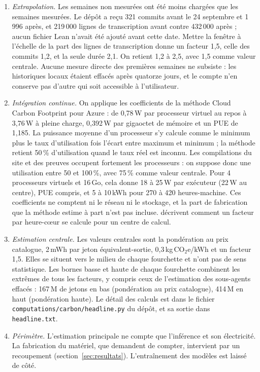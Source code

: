 \documentclass[11pt,a4paper]{article}
\newcommand{\COe}{\,kg\,CO$_2$e}
\begin{document}
\begin{enumerate}
\item \emph{Extrapolation.} Les semaines non mesurées ont été moins chargées que les semaines mesurées. Le dépôt a reçu 321 commits avant le 24 septembre et 1\,996 après, et 219\,000 lignes de transcription avant contre 432\,000 après ; aucun fichier Lean n'avait été ajouté avant cette date. Mettre la fenêtre à l'échelle de la part des lignes de transcription donne un facteur 1,5, celle des commits 1,2, et la seule durée 2,1. On retient 1,2 à 2,5, avec 1,5 comme valeur centrale. Aucune mesure directe des premières semaines ne subsiste : les historiques locaux étaient effacés après quatorze jours, et le compte n'en conserve pas d'autre qui soit accessible à l'utilisateur.
\item \emph{Intégration continue.} On applique les coefficients de la méthode Cloud Carbon Footprint pour Azure \citep{ccf} : de 0,78\,W par processeur virtuel au repos à 3,76\,W à pleine charge, 0,392\,W par gigaoctet de mémoire et un PUE de 1,185. La puissance moyenne d'un processeur s'y calcule comme le minimum plus le taux d'utilisation fois l'écart entre maximum et minimum ; la méthode retient 50\,\% d'utilisation quand le taux réel est inconnu. Les compilations du site et des preuves occupent fortement les processeurs : on suppose donc une utilisation entre 50 et 100\,\%, avec 75\,\% comme valeur centrale. Pour 4 processeurs virtuels et 16\,Go, cela donne 18 à 25\,W par exécuteur (22\,W au centre), PUE compris, et 5 à 10\,kWh pour 270 à 420 heures-machine. Ces coefficients ne comptent ni le réseau ni le stockage, et la part de fabrication que la méthode estime à part n'est pas incluse. \citet{benaben2024} décrivent comment un facteur par heure-cœur se calcule pour un centre de calcul.
\item \emph{Estimation centrale.} Les valeurs centrales sont la pondération au prix catalogue, 2\,mWh par jeton équivalent-sortie, 0,3\COe/kWh et un facteur 1,5. Elles se situent vers le milieu de chaque fourchette et n'ont pas de sens statistique. Les bornes basse et haute de chaque fourchette combinent les extrêmes de tous les facteurs, y compris ceux de l'estimation des sous-agents effacés : 167\,M de jetons en bas (pondération au prix catalogue), 414\,M en haut (pondération haute). Le détail des calculs est dans le fichier \texttt{computations/carbon/headline.py} du dépôt, et sa sortie dans \texttt{headline.txt}.
\item \emph{Périmètre.} L'estimation principale ne compte que l'inférence et son électricité. La fabrication du matériel, que \citet{ligozat2022} demandent de compter, intervient par un recoupement (section~\ref{sec:resultats}). L'entraînement des modèles est laissé de côté.
\end{enumerate}
\end{document}

